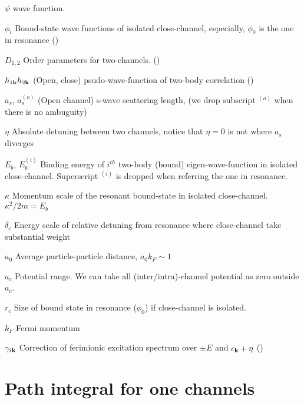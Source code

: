 \documentclass[edeposit,fullpage]{uiucthesis2009}
\begin{document}
\begin{symbollist}[0.7in]
\item[$\psi$] wave function.
\item[$\phi_{i}$] Bound-state wave functions of  isolated close-channel, especially, $\phi_{0}$ is the one in resonance (\pageref{eq:pathInt2:phi})
\item[$D_{1,2}$] Order parameters for two-channels. (\pageref{eq:pathInt2:Ddef})
\item[$h_{1\mathbf{k}} h_{2\mathbf{k}}$] (Open, close) psudo-wave-function of two-body correlation (\pageref{eq:pathInt2:h2})
\item[$a_{s}$, $a_{s}^{(o)}$] (Open channel) s-wave scattering length, (we drop subscript ${}^{(o)}$ when there is no ambuguity) 
\item[$\eta$] Absolute detuning between two channels, notice that $\eta=0$ is not where $a_{s}$ diverges
\item[$E_{b}$, $E_{b}^{(i)}$] Binding energy of $i^{th}$ two-body (bound) eigen-wave-function in isolated close-channel.  Superscript ${}^{(i)}$ is dropped when referring the one in resonance. 
\item[$\kappa$] Momentum scale of the resonant bound-state in isolated close-channel.  $\kappa^{2}/2m=E_{b}$
\item[$\delta_{c}$] Energy scale of relative detuning from resonance where close-channel take substantial weight
\item[$a_{0}$] Average particle-particle distance, $a_{0}k_{F}\sim1$
\item[$a_{c}$] Potential range.  We can take all (inter/intra)-channel potential as zero outside $a_{c}$.
\item[$r_{c}$] Size of bound state in resonance ($\phi_{0}$) if close-channel is isolated. 
\item[$k_{F}$] Fermi momentum
\item[$\gamma_{i\mathbf{k}}$] Correction of ferimionic excitation spectrum over $\pm{}E$ and $\epsilon_{\mathbf{k}}+\eta$ (\pageref{eq:pathInt2:xiExpand})
\end{symbollist}

\mainmatter

\section{Path integral for one channels}

\end{document}
